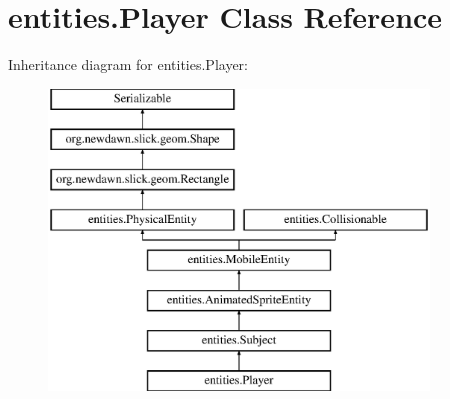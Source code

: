 \hypertarget{classentities_1_1_player}{}\section{entities.\+Player Class Reference}
\label{classentities_1_1_player}
Inheritance diagram for entities.\+Player\+:\begin{figure}[H]
\begin{center}
\leavevmode
\includegraphics[height=8.000000cm]{classentities_1_1_player}
\end{center}
\end{figure}
